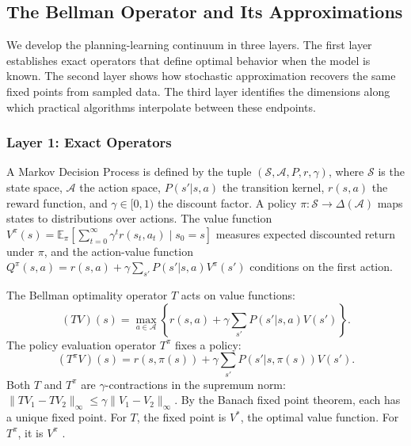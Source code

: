 
\subsection{The Bellman Operator and Its Approximations}

We develop the planning-learning continuum in three layers. The first layer establishes exact operators that define optimal behavior when the model is known. The second layer shows how stochastic approximation recovers the same fixed points from sampled data. The third layer identifies the dimensions along which practical algorithms interpolate between these endpoints.

\subsubsection{Layer 1: Exact Operators}

A Markov Decision Process is defined by the tuple $(\mathcal{S}, \mathcal{A}, P, r, \gamma)$, where $\mathcal{S}$ is the state space, $\mathcal{A}$ the action space, $P(s'|s,a)$ the transition kernel, $r(s,a)$ the reward function, and $\gamma \in [0,1)$ the discount factor. A policy $\pi: \mathcal{S} \to \Delta(\mathcal{A})$ maps states to distributions over actions. The value function $V^\pi(s) = \mathbb{E}_\pi\left[\sum_{t=0}^{\infty} \gamma^t r(s_t, a_t) \mid s_0 = s\right]$ measures expected discounted return under $\pi$, and the action-value function $Q^\pi(s,a) = r(s,a) + \gamma \sum_{s'} P(s'|s,a) V^\pi(s')$ conditions on the first action.

The Bellman optimality operator $T$ acts on value functions:
\begin{equation}
(TV)(s) = \max_{a \in \mathcal{A}} \left\{ r(s,a) + \gamma \sum_{s'} P(s'|s,a) V(s') \right\}.
\label{eq:bellman_optimality}
\end{equation}
The policy evaluation operator $T^\pi$ fixes a policy:
\begin{equation}
(T^\pi V)(s) = r(s,\pi(s)) + \gamma \sum_{s'} P(s'|s,\pi(s)) V(s').
\label{eq:bellman_evaluation}
\end{equation}
Both $T$ and $T^\pi$ are $\gamma$-contractions in the supremum norm: $\|TV_1 - TV_2\|_\infty \leq \gamma \|V_1 - V_2\|_\infty$. By the Banach fixed point theorem, each has a unique fixed point. For $T$, the fixed point is $V^*$, the optimal value function. For $T^\pi$, it is $V^\pi$ \citep{bertsekas1996}.

